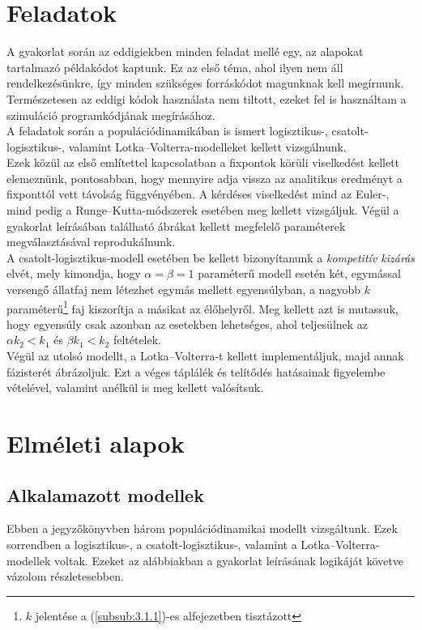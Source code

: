 \begin{multicols}{2}
\section{Feladatok} \label{sec:2}
A gyakorlat során az eddigiekben minden feladat mellé egy, az alapokat tartalmazó példakódot kaptunk. Ez az első téma, ahol ilyen nem áll rendelkezésünkre, így minden szükséges forráskódot magunknak kell megírnunk. Természetesen az eddigi kódok használata nem tiltott, ezeket fel is használtam a szimuláció programkódjának megírásához. \\
A feladatok során a populációdinamikában is ismert logisztikus-, csatolt-logisztikus-, valamint Lotka--Volterra-modelleket kellett vizsgálnunk. \\
Ezek közül az első említettel kapcsolatban a fixpontok körüli viselkedést kellett elemeznünk, pontosabban, hogy mennyire adja vissza az analitikus eredményt a fixponttól vett távolság függvényében. A kérdéses viselkedést mind az Euler-, mind pedig a Runge--Kutta-módszerek esetében meg kellett vizsgáljuk. Végül a gyakorlat leírásában található ábrákat kellett megfelelő paraméterek megválasztásával reprodukálnunk. \\
A csatolt-logisztikus-modell esetében be kellett bizonyítanunk a \emph{kompetitív kizárás} elvét, mely kimondja, hogy $\alpha = \beta = 1$ paraméterű modell esetén két, egymással versengő állatfaj nem létezhet egymás mellett egyensúlyban, a nagyobb $k$ paraméterű\footnote{$k$ jelentése a (\ref{subsub:3.1.1})-es alfejezetben tisztázott} faj kiszorítja a másikat az élőhelyről. Meg kellett azt is mutassuk, hogy egyensúly csak azonban az esetekben lehetséges, ahol teljesülnek az $\alpha k_{2} <k_{1}$ és $\beta k_{1} < k_{2}$ feltételek. \\
Végül az utolsó modellt, a Lotka--Volterra-t kellett implementáljuk, majd annak fázisterét ábrázoljuk. Ezt a véges táplálék és telítődés hatásainak figyelembe vételével, valamint anélkül is meg kellett valósítsuk.

\section{Elméleti alapok} \label{sec:3}
\subsection{Alkalamazott modellek} \label{sub:3.1}
Ebben a jegyzőkönyvben három populációdinamikai modellt vizsgáltunk. Ezek sorrendben a logisztikus-, a csatolt-logisztikus-, valamint a Lotka--Volterra-modellek voltak. Ezeket az alábbiakban a gyakorlat leírásának logikáját követve vázolom részletesebben.


\end{multicols}
